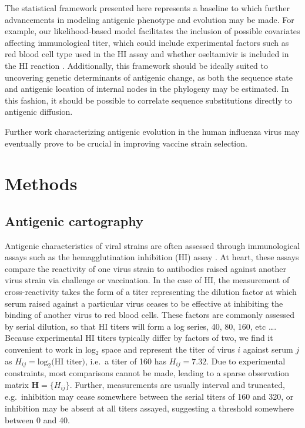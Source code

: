 \documentclass[11pt,oneside,letterpaper]{article}
\begin{document}
The statistical framework presented here represents a baseline to which further advancements in modeling antigenic phenotype and evolution may be made.
For example, our likelihood-based model facilitates the inclusion of possible covariates affecting immunological titer, which could include experimental factors such as red blood cell type used in the HI assay \cite{Lin12} and whether oseltamivir is included in the HI reaction \cite{Lin10}.
Additionally, this framework should be ideally suited to uncovering genetic determinants of antigenic change, as both the sequence state and antigenic location of internal nodes in the phylogeny may be estimated.
In this fashion, it should be possible to correlate sequence substitutions directly to antigenic diffusion.

Further work characterizing antigenic evolution in the human influenza virus may eventually prove to be crucial in improving vaccine strain selection.

\section*{Methods}

\subsection*{Antigenic cartography}

Antigenic characteristics of viral strains are often assessed through immunological assays such as the hemagglutination inhibition (HI) assay \cite{Hirst43}.  
At heart, these assays compare the reactivity of one virus strain to antibodies raised against another virus strain via challenge or vaccination.  
In the case of HI, the measurement of cross-reactivity takes the form of a titer representing the dilution factor at which serum raised against a particular virus ceases to be effective at inhibiting the binding of another virus to red blood cells.  
These factors are commonly assessed by serial dilution, so that HI titers will form a log series, 40, 80, 160, etc \dots.
Because experimental HI titers typically differ by factors of two, we find it convenient to work in log$_2$ space and represent the titer of virus $i$ against serum $j$ as $H_{ij} = \mathrm{log}_2 \mbox{(HI titer)}$, i.e.\ a titer of 160 has $H_{ij} = 7.32$.
Due to experimental constraints, most comparisons cannot be made, leading to a sparse observation matrix $\mathbf{H} = \{H_{ij}\}$.  
Further, measurements are usually interval and truncated, e.g.\ inhibition may cease somewhere between the serial titers of 160 and 320, or inhibition may be absent at all titers assayed, suggesting a threshold somewhere between 0 and 40.  
\end{document}
